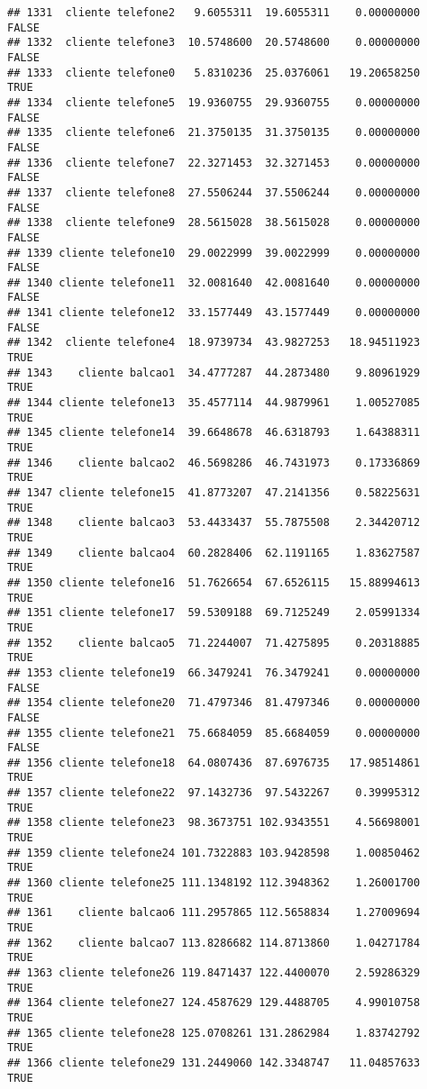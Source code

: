 \documentclass[
]{article}
\begin{document}
\begin{verbatim}
## 1331  cliente telefone2   9.6055311  19.6055311    0.00000000    FALSE
## 1332  cliente telefone3  10.5748600  20.5748600    0.00000000    FALSE
## 1333  cliente telefone0   5.8310236  25.0376061   19.20658250     TRUE
## 1334  cliente telefone5  19.9360755  29.9360755    0.00000000    FALSE
## 1335  cliente telefone6  21.3750135  31.3750135    0.00000000    FALSE
## 1336  cliente telefone7  22.3271453  32.3271453    0.00000000    FALSE
## 1337  cliente telefone8  27.5506244  37.5506244    0.00000000    FALSE
## 1338  cliente telefone9  28.5615028  38.5615028    0.00000000    FALSE
## 1339 cliente telefone10  29.0022999  39.0022999    0.00000000    FALSE
## 1340 cliente telefone11  32.0081640  42.0081640    0.00000000    FALSE
## 1341 cliente telefone12  33.1577449  43.1577449    0.00000000    FALSE
## 1342  cliente telefone4  18.9739734  43.9827253   18.94511923     TRUE
## 1343    cliente balcao1  34.4777287  44.2873480    9.80961929     TRUE
## 1344 cliente telefone13  35.4577114  44.9879961    1.00527085     TRUE
## 1345 cliente telefone14  39.6648678  46.6318793    1.64388311     TRUE
## 1346    cliente balcao2  46.5698286  46.7431973    0.17336869     TRUE
## 1347 cliente telefone15  41.8773207  47.2141356    0.58225631     TRUE
## 1348    cliente balcao3  53.4433437  55.7875508    2.34420712     TRUE
## 1349    cliente balcao4  60.2828406  62.1191165    1.83627587     TRUE
## 1350 cliente telefone16  51.7626654  67.6526115   15.88994613     TRUE
## 1351 cliente telefone17  59.5309188  69.7125249    2.05991334     TRUE
## 1352    cliente balcao5  71.2244007  71.4275895    0.20318885     TRUE
## 1353 cliente telefone19  66.3479241  76.3479241    0.00000000    FALSE
## 1354 cliente telefone20  71.4797346  81.4797346    0.00000000    FALSE
## 1355 cliente telefone21  75.6684059  85.6684059    0.00000000    FALSE
## 1356 cliente telefone18  64.0807436  87.6976735   17.98514861     TRUE
## 1357 cliente telefone22  97.1432736  97.5432267    0.39995312     TRUE
## 1358 cliente telefone23  98.3673751 102.9343551    4.56698001     TRUE
## 1359 cliente telefone24 101.7322883 103.9428598    1.00850462     TRUE
## 1360 cliente telefone25 111.1348192 112.3948362    1.26001700     TRUE
## 1361    cliente balcao6 111.2957865 112.5658834    1.27009694     TRUE
## 1362    cliente balcao7 113.8286682 114.8713860    1.04271784     TRUE
## 1363 cliente telefone26 119.8471437 122.4400070    2.59286329     TRUE
## 1364 cliente telefone27 124.4587629 129.4488705    4.99010758     TRUE
## 1365 cliente telefone28 125.0708261 131.2862984    1.83742792     TRUE
## 1366 cliente telefone29 131.2449060 142.3348747   11.04857633     TRUE

\end{verbatim}
\end{document}
